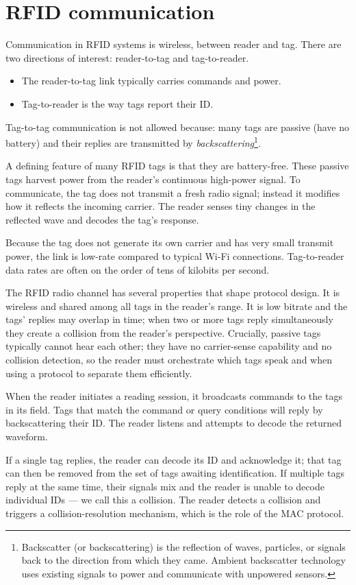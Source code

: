 \section{RFID communication}
Communication in RFID systems is wireless, between reader and tag. There are two directions of interest: reader-to-tag and tag-to-reader. 
\begin{itemize}
    \item The reader-to-tag link typically carries commands and power.
    \item Tag-to-reader is the way tags report their ID. 
\end{itemize}
Tag-to-tag communication is not allowed because: many tags are passive (have no battery) and their replies are transmitted by \textit{backscattering}\footnote{Backscatter (or backscattering) is the reflection of waves, particles, or signals back to the direction from which they came. Ambient backscatter technology uses existing signals to power and communicate with unpowered sensors.}.

A defining feature of many RFID tags is that they are battery-free. These passive tags harvest power from the reader’s continuous high-power signal. To communicate, the tag does not transmit a fresh radio signal; instead it modifies how it reflects the incoming carrier. The reader senses tiny changes in the reflected wave and decodes the tag’s response.

Because the tag does not generate its own carrier and has very small transmit power, the link is low-rate compared to typical Wi‑Fi connections. Tag-to-reader data rates are often on the order of tens of kilobits per second.

The RFID radio channel has several properties that shape protocol design. It is wireless and shared among all tags in the reader’s range. It is low bitrate and the tags’ replies may overlap in time; when two or more tags reply simultaneously they create a collision from the reader’s perspective. Crucially, passive tags typically cannot hear each other; they have no carrier-sense capability and no collision detection, so the reader must orchestrate which tags speak and when using a protocol to separate them efficiently.

When the reader initiates a reading session, it broadcasts commands to the tags in its field. Tags that match the command or query conditions will reply by backscattering their ID. The reader listens and attempts to decode the returned waveform.

If a single tag replies, the reader can decode its ID and acknowledge it; that tag can then be removed from the set of tags awaiting identification. If multiple tags reply at the same time, their signals mix and the reader is unable to decode individual IDs — we call this a collision. The reader detects a collision and triggers a collision-resolution mechanism, which is the role of the MAC protocol.

